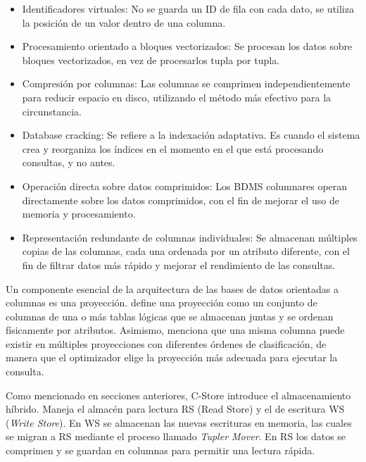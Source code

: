     \begin{itemize}
        \item Identificadores virtuales: No se guarda un ID de fila con cada dato, se utiliza la posición de un valor dentro de una columna.
        \item Procesamiento orientado a bloques vectorizados: Se procesan los datos sobre bloques vectorizados, en vez de procesarlos tupla por tupla.
        \item Compresión por columnas: Las columnas se comprimen independientemente para reducir espacio en disco, utilizando el método más efectivo para la circunstancia.
        \item Database cracking: Se refiere a la indexación adaptativa. Es cuando el sistema crea y reorganiza los índices en el momento en el que está procesando consultas, y no antes.
        \item Operación directa sobre datos comprimidos: Los BDMS columnares operan directamente sobre los datos comprimidos, con el fin de mejorar el uso de memoria y procesamiento.
        \item Representación redundante de columnas individuales: Se almacenan múltiples copias de las columnas, cada una ordenada por un atributo diferente, con el fin de filtrar datos más rápido y mejorar el rendimiento de las consultas.
    \end{itemize}

Un componente esencial de la arquitectura de las bases de datos orientadas a columnas es una proyección. \textcite{matei2010} define una proyección como un conjunto de columnas de una o más tablas lógicas que se almacenan juntas y se ordenan físicamente por atributos. Asimismo, \textcite{stonebraker2005cstore} menciona que una misma columna puede existir en múltiples proyecciones con diferentes órdenes de clasificación, de manera que el optimizador elige la proyección más adecuada para ejecutar la consulta.

Como mencionado en secciones anteriores, C-Store introduce el almacenamiento híbrido. Maneja el almacén para lectura RS (Read Store) y el de escritura WS (\textit{Write Store}). En WS se almacenan las nuevas escrituras en memoria, las cuales se migran a RS mediante el proceso llamado \textit{Tupler Mover}. En RS los datos se comprimen y se guardan en columnas para permitir una lectura rápida. 
